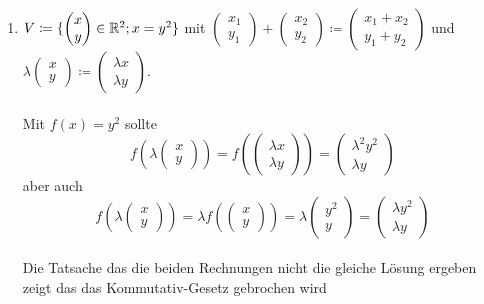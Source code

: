 \documentclass{HM}
\begin{document}
\begin{enumerate}
\begin{enumerate}
\item $V\coloneqq\lbrace\begin{pmatrix}
x\\
y
\end{pmatrix}\in\mathbb{R}^2; x=y^2 \rbrace$ mit $\begin{pmatrix}
x_1\\
y_1
\end{pmatrix}+\begin{pmatrix}
x_2\\
y_2
\end{pmatrix}\coloneqq\begin{pmatrix}
x_1+x_2\\
y_1+y_2
\end{pmatrix}$ und $\lambda\begin{pmatrix}
x\\
y
\end{pmatrix}\coloneqq\begin{pmatrix}
\lambda x\\
\lambda y
\end{pmatrix}$.\\\\
Mit $f(x)=y^2$ sollte
$$f\left(\lambda\begin{pmatrix}x\\y\end{pmatrix}\right)=
f\left(\begin{pmatrix}\lambda x\\\lambda y\end{pmatrix}\right)=
\begin{pmatrix}
	\lambda^2y^2\\\lambda y
\end{pmatrix}$$
aber auch
$$
f\left(\lambda\begin{pmatrix}x\\y\end{pmatrix}\right)=
\lambda f\left(\begin{pmatrix}x\\y\end{pmatrix}\right)=
\lambda\begin{pmatrix}y^2\\y\end{pmatrix}=
\begin{pmatrix}\lambda y^2\\\lambda y\end{pmatrix}$$\\
Die Tatsache das die beiden Rechnungen nicht die gleiche Lösung ergeben zeigt das das Kommutativ-Gesetz gebrochen wird

\end{enumerate}
\end{enumerate}
\end{document}
